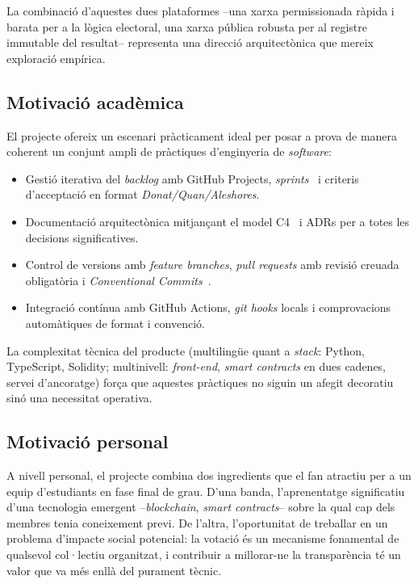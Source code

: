 La combinació d'aquestes dues plataformes --una xarxa permissionada ràpida i barata per a la lògica electoral, una xarxa
pública robusta per al registre immutable del resultat-- representa una direcció arquitectònica que mereix exploració
empírica.

\subsection{Motivació acadèmica}
\label{subsec:motivacio-academica}

El projecte ofereix un escenari pràcticament ideal per posar a prova de manera coherent un conjunt ampli de pràctiques
d'enginyeria de \textit{software}:

\begin{itemize}
    \item Gestió iterativa del \emph{backlog} amb GitHub Projects, \emph{sprints}~\cite{schwaber2020scrum} i criteris
    d'acceptació en format \emph{Donat/Quan/Aleshores}.

    \item Documentació arquitectònica mitjançant el model C4~\cite{brown2018c4} i \acp{ADR} per a totes les decisions
    significatives.

    \item Control de versions amb \emph{feature branches}, \emph{pull requests} amb revisió creuada obligatòria i
    \emph{Conventional Commits}~\cite{conventionalcommits}.

    \item Integració contínua amb GitHub Actions, \emph{git hooks} locals i comprovacions automàtiques de format i
    convenció.
\end{itemize}

La complexitat tècnica del producte (multilingüe quant a \emph{stack}: Python, TypeScript, Solidity; multinivell:
\emph{\textit{front-end}}, \emph{smart contracts} en dues cadenes, servei d'ancoratge) força que aquestes pràctiques no
siguin un afegit decoratiu sinó una necessitat operativa.

\subsection{Motivació personal}
\label{subsec:motivacio-personal}

A nivell personal, el projecte combina dos ingredients que el fan atractiu per a un equip d'estudiants en fase final de
grau.
D'una banda, l'aprenentatge significatiu d'una tecnologia emergent --\emph{blockchain}, \emph{smart contracts}-- sobre
la qual cap dels membres tenia coneixement previ.
De l'altra, l'oportunitat de treballar en un problema d'impacte social potencial: la votació és un mecanisme fonamental
de qualsevol col·lectiu organitzat, i contribuir a millorar-ne la transparència té un valor que va més enllà del
purament tècnic.

